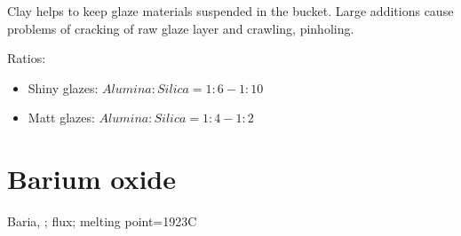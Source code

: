 Clay helps to keep glaze materials suspended in 
the bucket. Large additions cause problems of cracking of raw glaze layer and 
crawling, pinholing.

Ratios:
\begin{itemize}
\item Shiny glazes: $Alumina:Silica = 1:6-1:10$
\item Matt glazes: $Alumina:Silica = 1:4-1:2$
\end{itemize}
\section{Barium oxide}
Baria, ; flux; melting point=1923\degree C

